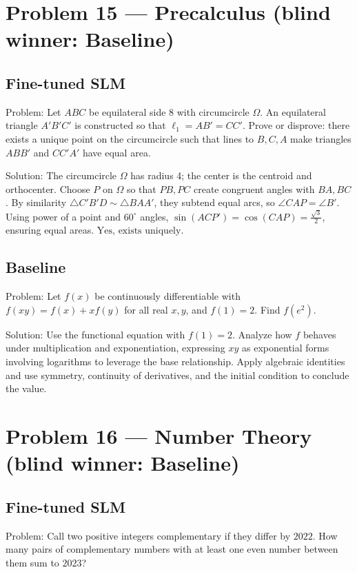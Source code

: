 \documentclass[11pt]{article}
\begin{document}
\section*{Problem 15 --- Precalculus \quad(blind winner: Baseline)}

\subsection*{Fine-tuned SLM}

Problem:
Let $ABC$ be equilateral side 8 with circumcircle $\Omega$. An equilateral triangle $A'B'C'$ is constructed so that $\ell_1 = AB' = CC'$. Prove or disprove: there exists a unique point on the circumcircle such that lines to $B,C,A$ make triangles $ABB'$ and $CC'A'$ have equal area.

Solution:
The circumcircle $\Omega$ has radius 4; the center is the centroid and orthocenter. Choose $P$ on $\Omega$ so that $PB, PC$ create congruent angles with $BA, BC$. By similarity $\triangle C'B'D \sim \triangle BAA'$, they subtend equal arcs, so $\angle CAP = \angle B'$. Using power of a point and $60^\circ$ angles, $\sin(ACP')=\cos(CAP)=\frac{\sqrt3}2$, ensuring equal areas. $\boxed{\text{Yes, exists uniquely.}}$

\subsection*{Baseline}

Problem:
Let $f(x)$ be continuously differentiable with $f(xy) = f(x) + xf(y)$ for all real $x,y$, and $f(1) = 2$. Find $f(e^2)$.

Solution:
Use the functional equation with $f(1)=2$. Analyze how $f$ behaves under multiplication and exponentiation, expressing $xy$ as exponential forms involving logarithms to leverage the base relationship. Apply algebraic identities and use symmetry, continuity of derivatives, and the initial condition to conclude the value.

\section*{Problem 16 --- Number Theory \quad(blind winner: Baseline)}

\subsection*{Fine-tuned SLM}

Problem:
Call two positive integers complementary if they differ by $2022$. How many pairs of complementary numbers with at least one even number between them sum to $2023$?
\end{document}
